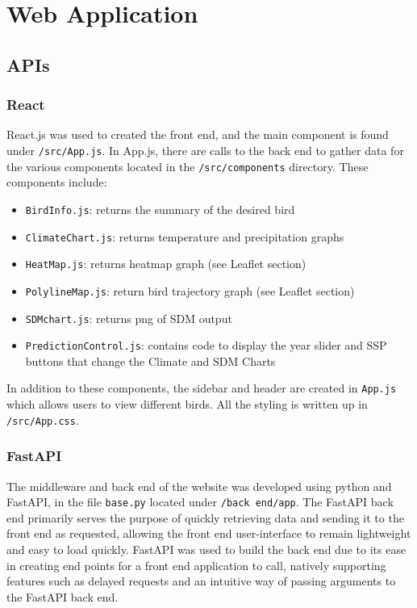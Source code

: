 \documentclass{article}
\begin{document}
\section{Web Application}

\subsection{APIs}

\subsubsection{React}
React.js was used to created the front end, and the main component is found under \texttt{/src/App.js}. In App.js, there are calls to the back end to gather data for the various components
located in the \texttt{/src/components} directory. These components include:
\begin{itemize}
	\item \texttt{BirdInfo.js}: returns the summary of the desired bird
	\item \texttt{ClimateChart.js}: returns temperature and precipitation graphs
	\item \texttt{HeatMap.js}: returns heatmap graph (see Leaflet section)
	\item \texttt{PolylineMap.js}: return bird trajectory graph (see Leaflet section)
	\item \texttt{SDMchart.js}: returns png of SDM output
	\item \texttt{PredictionControl.js}: contains code to display the year slider and SSP buttons that change the Climate and SDM Charts
\end{itemize}

\noindent In addition to these components, the sidebar and header are created in \texttt{App.js} which allows users to view different birds. All the styling is written up in \texttt{/src/App.css}. 


\subsubsection{FastAPI}
The middleware and back end of the website was developed using python and FastAPI, in the file \texttt{base.py} located under \texttt{/back end/app}. The FastAPI back end primarily serves the purpose of quickly retrieving data and sending it to the front end as requested, allowing the front end user-interface to remain lightweight and easy to load quickly. FastAPI was used to build the back end due to its ease in creating end points for a front end application to call, natively supporting features such as delayed requests and an intuitive way of passing arguments to the FastAPI back end.
\end{document}
